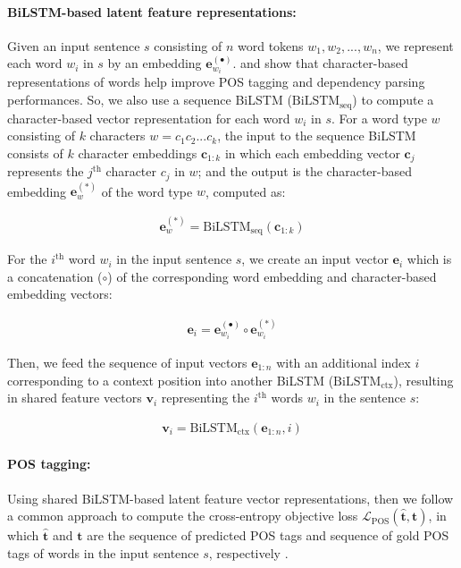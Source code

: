 \documentclass[11pt,letterpaper]{article}
\begin{document}
\paragraph{BiLSTM-based latent feature representations:} 
Given an input sentence $s$ consisting of $n$ word tokens $w_1, w_2, ..., w_n$, we represent each word $w_i$ in $s$ by an embedding $\mathbf{e}^{(\bullet)}_{w_i}$.   \citet{plankP16} and \citet{ballesterosEMNLP} show that character-based  representations of words help improve POS tagging and dependency parsing performances. So, we also use a sequence BiLSTM ($\mathrm{BiLSTM}_{\text{seq}}$) to compute a character-based  vector representation for each word $w_i$ in $s$. 
For a word type $w$ consisting of $k$ characters $w=c_1c_2...c_k$,  the input to the sequence BiLSTM consists of $k$ character embeddings $\mathbf{c}_{1:k}$ in which each embedding vector $\mathbf{c}_{j}$ represents the $j^{\text{th}}$ character $c_j$ in $w$; and  the output is the character-based embedding $\mathbf{e}^{(*)}_w$ of the word type $w$,  computed as:

\setlength{\abovedisplayskip}{-0pt}
\begin{eqnarray*}
\mathbf{e}^{(*)}_w = \mathrm{BiLSTM}_{\text{seq}}(\mathbf{c}_{1:k})
\end{eqnarray*}

For the $i^{\text{th}}$ word $w_i$ in the input sentence $s$, we create an input vector $\mathbf{e}_{i}$ which is a  concatenation ($\circ$) of the corresponding word embedding and character-based embedding vectors:

\begin{eqnarray*}
\mathbf{e}_{i} =  \mathbf{e}^{(\bullet)}_{w_i} \circ \mathbf{e}^{(*)}_{w_i}
\end{eqnarray*}

Then, we feed the sequence of input vectors $\mathbf{e}_{1:n}$ with an additional index $i$ corresponding to a context position  into another  BiLSTM ($\mathrm{BiLSTM}_{\text{ctx}}$), resulting in shared  feature vectors $\boldsymbol{v}_{i}$ representing the $i^{\text{th}}$ words $w_i$ in the  sentence $s$:

\begin{eqnarray*}
\boldsymbol{v}_{i} =   \mathrm{BiLSTM}_{\text{ctx}} (\mathbf{e}_{1:n}, i)
\end{eqnarray*}

\paragraph{POS tagging:} Using shared BiLSTM-based latent feature vector representations, then we follow a common approach to compute the cross-entropy objective loss $\mathcal{L}_{\text{POS}}(\hat{\mathbf{t}}, \mathbf{t})$, in which $\hat{\mathbf{t}}$ and $\mathbf{t}$ are the sequence of predicted POS tags and sequence of gold POS tags of words in the input sentence $s$, respectively \citep{Goldberg16,plankP16}.
\end{document}

